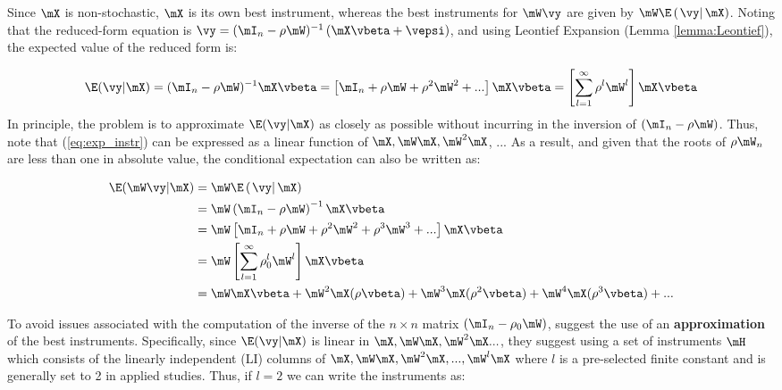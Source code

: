 \documentclass[english,12pt]{book}\usepackage[]{graphicx}\usepackage[]{xcolor}
\begin{document}
Since $\mX$ is non-stochastic, $\mX$ is its own best instrument, whereas the best instruments for $\mW\vy$ are given by $\mW\E\left(\left.\vy\right|\mX\right)$. Noting that the reduced-form equation is $\vy = (\mI_n - \rho\mW)^{-1}\left(\mX\vbeta + \vepsi \right)$, and using Leontief Expansion (Lemma \ref{lemma:Leontief}), the expected value of the reduced form is:

\begin{equation}\label{eq:exp_instr}
  \E(\vy|\mX) = (\mI_n - \rho\mW)^{-1}\mX\vbeta = \left[\mI_n + \rho\mW + \rho^2\mW^2 + ...\right]\mX\vbeta = \left[\sum_{l = 1}^{\infty}\rho^{l}\mW^l\right]\mX\vbeta
\end{equation}
%
In principle, the problem is to approximate $\E(\vy|\mX)$ as closely as possible without incurring in the inversion of $(\mI_n - \rho\mW)$. Thus, note that  (\ref{eq:exp_instr}) can be expressed as a linear function of $\mX, \mW\mX, \mW^2\mX$, ... As a result, and given that the roots of $\rho\mW_n$ are less than one in absolute value,  the conditional expectation can also be written as:

\begin{equation*}
  \begin{aligned}
\E(\mW\vy|\mX) & = \mW\E\left(\left. \vy\right| \mX\right) \\
               & = \mW\left(\mI_n - \rho \mW\right)^{-1}\mX\vbeta \\
               & = \mW\left[\mI_n + \rho\mW + \rho^2\mW^2 + \rho^3\mW^3 + ...\right]\mX\vbeta \\
               & = \mW\left[\sum_{l = 1}^{\infty}\rho_0^{l}\mW^l\right]\mX\vbeta \\
               & = \mW\mX\vbeta + \mW^2\mX(\rho\vbeta) + \mW^3\mX(\rho^2\vbeta) + \mW^4\mX(\rho^3\vbeta) + ...
  \end{aligned}
\end{equation*}

To avoid issues associated with the computation of the inverse of the $n\times n$ matrix $(\mI_n - \rho_0\mW)$, \cite{kelejian1998generalized, kelejian1999generalized} suggest the use of an \textbf{approximation} of the best instruments. Specifically, since $\E(\vy|\mX)$ is linear in $\mX, \mW\mX, \mW^2\mX...$, they suggest using a set of instruments $\mH$ which consists of the linearly independent (LI) columns of  $\mX, \mW\mX, \mW^2\mX, ... , \mW^l\mX$  where $l$ is a pre-selected finite constant and is generally set to 2 in applied studies. Thus, if $l =2$ we can write the instruments as:
\end{document}
